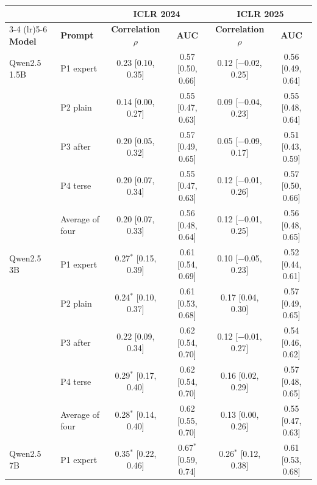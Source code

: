 \begin{tabular}{llcccc}
\toprule
 & & \multicolumn{2}{c}{\textbf{ICLR 2024}} & \multicolumn{2}{c}{\textbf{ICLR 2025}} \\
\cmidrule(lr){3-4} \cmidrule(lr){5-6}
\textbf{Model} & \textbf{Prompt} & \textbf{Correlation $\rho$} & \textbf{AUC} & \textbf{Correlation $\rho$} & \textbf{AUC} \\
\midrule
Qwen2.5 1.5B & P1 expert & 0.23 {\scriptsize[0.10, 0.35]} & 0.57 {\scriptsize[0.50, 0.66]} & 0.12 {\scriptsize[$-$0.02, 0.25]} & 0.56 {\scriptsize[0.49, 0.64]} \\
 & P2 plain & 0.14 {\scriptsize[0.00, 0.27]} & 0.55 {\scriptsize[0.47, 0.63]} & 0.09 {\scriptsize[$-$0.04, 0.23]} & 0.55 {\scriptsize[0.48, 0.64]} \\
 & P3 after & 0.20 {\scriptsize[0.05, 0.32]} & 0.57 {\scriptsize[0.49, 0.65]} & 0.05 {\scriptsize[$-$0.09, 0.17]} & 0.51 {\scriptsize[0.43, 0.59]} \\
 & P4 terse & 0.20 {\scriptsize[0.07, 0.34]} & 0.55 {\scriptsize[0.47, 0.63]} & 0.12 {\scriptsize[$-$0.01, 0.26]} & 0.57 {\scriptsize[0.50, 0.66]} \\
 & Average of four & 0.20 {\scriptsize[0.07, 0.33]} & 0.56 {\scriptsize[0.48, 0.64]} & 0.12 {\scriptsize[$-$0.01, 0.25]} & 0.56 {\scriptsize[0.48, 0.65]} \\
\midrule
Qwen2.5 3B & P1 expert & 0.27$^{*}$ {\scriptsize[0.15, 0.39]} & 0.61 {\scriptsize[0.54, 0.69]} & 0.10 {\scriptsize[$-$0.05, 0.23]} & 0.52 {\scriptsize[0.44, 0.61]} \\
 & P2 plain & 0.24$^{*}$ {\scriptsize[0.10, 0.37]} & 0.61 {\scriptsize[0.53, 0.68]} & 0.17 {\scriptsize[0.04, 0.30]} & 0.57 {\scriptsize[0.49, 0.65]} \\
 & P3 after & 0.22 {\scriptsize[0.09, 0.34]} & 0.62 {\scriptsize[0.54, 0.70]} & 0.12 {\scriptsize[$-$0.01, 0.27]} & 0.54 {\scriptsize[0.46, 0.62]} \\
 & P4 terse & 0.29$^{*}$ {\scriptsize[0.17, 0.40]} & 0.62 {\scriptsize[0.54, 0.70]} & 0.16 {\scriptsize[0.02, 0.29]} & 0.57 {\scriptsize[0.48, 0.65]} \\
 & Average of four & 0.28$^{*}$ {\scriptsize[0.14, 0.40]} & 0.62 {\scriptsize[0.55, 0.70]} & 0.13 {\scriptsize[0.00, 0.26]} & 0.55 {\scriptsize[0.47, 0.63]} \\
\midrule
Qwen2.5 7B & P1 expert & 0.35$^{*}$ {\scriptsize[0.22, 0.46]} & 0.67$^{*}$ {\scriptsize[0.59, 0.74]} & 0.26$^{*}$ {\scriptsize[0.12, 0.38]} & 0.61 {\scriptsize[0.53, 0.68]} \\

\end{tabular}
